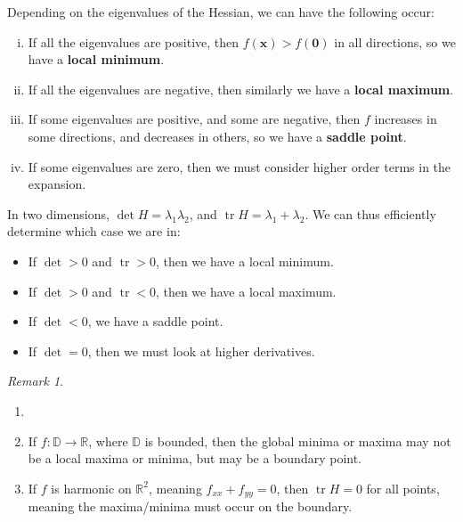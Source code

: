 \documentclass[12pt]{article}
\DeclareMathOperator{\tr}{tr}
\theoremstyle{definition}
\theoremstyle{remark}
\newtheorem*{remark}{Remark}
\begin{document}
Depending on the eigenvalues of the Hessian, we can have the following occur:
\begin{enumerate}[(i)]
	\item If all the eigenvalues are positive, then $f(\mathbf{x}) > f(\mathbf{0})$ in all directions, so we have a \textbf{local minimum}.
	\item If all the eigenvalues are negative, then similarly we have a \textbf{local maximum}.
	\item If some eigenvalues are positive, and some are negative, then $f$ increases in some directions, and decreases in others, so we have a \textbf{saddle point}.
	\item If some eigenvalues are zero, then we must consider higher order terms in the expansion.
\end{enumerate}

In two dimensions, $\det H = \lambda_1 \lambda_2$, and $\tr H = \lambda_1 + \lambda_2$. We can thus efficiently determine which case we are in:
\begin{itemize}
	\item If $\det > 0$ and $\tr > 0$, then we have a local minimum.
	\item If $\det > 0$ and $\tr < 0$, then we have a local maximum.
	\item If $\det < 0$, we have a saddle point.
	\item If $\det = 0$, then we must look at higher derivatives.
\end{itemize}

\begin{remark}
	\begin{enumerate}[1)]
		\item[]
		\item If $f : \mathbb{D} \to \mathbb{R}$, where $\mathbb{D}$ is bounded, then the global minima or maxima may not be a local maxima or minima, but may be a boundary point.
		\item If $f$ is harmonic on $\mathbb{R}^2$, meaning $f_{xx} + f_{yy} = 0$, then $\tr H = 0$ for all points, meaning the maxima/minima must occur on the boundary.
	\end{enumerate}
\end{remark}
\end{document}
